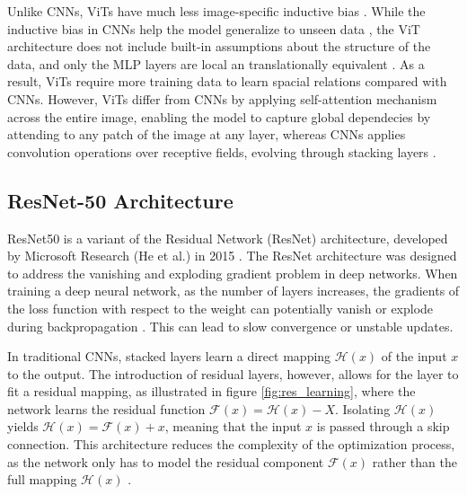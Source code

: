 \noindent Unlike CNNs, ViTs have much less image-specific inductive bias \cite{dosovitskiy2021imageworth16x16words}. While the inductive bias in CNNs help the model generalize to unseen data \cite{kim2020inductivebias}, the ViT architecture does not include built-in assumptions about the structure of the data, and only the MLP layers are local an translationally equivalent \cite{dosovitskiy2021imageworth16x16words}. As a result, ViTs require more training data to learn spacial relations compared with CNNs. However, ViTs differ from CNNs by applying self-attention mechanism across the entire image, enabling the model to capture global dependecies by attending to any patch of the image at any layer, whereas CNNs applies convolution operations over receptive fields, evolving through stacking layers \cite{cs231n}.




\subsection{ResNet-50 Architecture}
\label{sec:resnet}
ResNet50 is a variant of the Residual Network (ResNet) architecture, developed by Microsoft Research (He et al.) in 2015 \cite{he2015deepresiduallearningimage}. The ResNet architecture was designed to address the vanishing and exploding gradient problem in deep networks. When training a deep neural network, as the number of layers increases, the gradients of the loss function with respect to the weight can potentially vanish or explode during backpropagation \cite{he2015deepresiduallearningimage}. This can lead to slow convergence or unstable updates.

In traditional CNNs, stacked layers learn a direct mapping $\mathcal{H}(x)$ of the input $x$ to the output. The introduction of residual layers, however, allows for the layer to fit a residual mapping, as illustrated in figure \ref{fig:res_learning}, where the network learns the residual function $\mathcal{F}(x) = \mathcal{H}(x) - X$. Isolating $\mathcal{H}(x)$ yields $\mathcal{H}(x) = \mathcal{F}(x) + x$, meaning that the input $x$ is passed through a skip connection. This architecture reduces the complexity of the optimization process, as the network only has to model the residual component $\mathcal{F}(x)$ rather than the full mapping $\mathcal{H}(x)$ \cite{he2015deepresiduallearningimage}.

